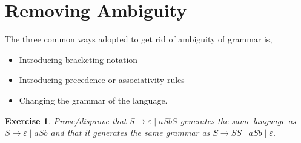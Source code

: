 \documentclass[a4paper]{scrartcl}
\newtheorem*{exercise}{Exercise}
\theoremstyle{definition}
\newcommand{\eps}{\varepsilon}
\begin{document}
\section{Removing Ambiguity}
The three common ways adopted to get rid of ambiguity of grammar is,
\begin{itemize}
	\item Introducing bracketing notation
	\item Introducing precedence or associativity rules
	\item Changing the grammar of the language.
\end{itemize}

\begin{exercise}
	Prove/disprove that $S \to \eps \mid a S b S$ generates the same language as $S \to \eps \mid a S b$ and that it generates the same grammar as $S \to SS \mid a S b \mid \eps$.
\end{exercise}
\end{document}
